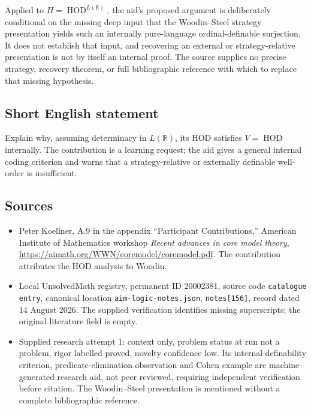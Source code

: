 \documentclass[11pt]{article}
\newcommand{\R}{\mathbb{R}}
\begin{document}
Applied to $H=\operatorname{HOD}^{L(\R)}$, the aid's proposed argument is deliberately conditional on the missing deep input that the Woodin--Steel strategy presentation yields such an internally pure-language ordinal-definable surjection. It does not establish that input, and recovering an external or strategy-relative presentation is not by itself an internal proof. The source supplies no precise strategy, recovery theorem, or full bibliographic reference with which to replace that missing hypothesis.
\subsection{Short English statement}
Explain why, assuming determinacy in $L(\R)$, its HOD satisfies $V=\operatorname{HOD}$ internally. The contribution is a learning request; the aid gives a general internal coding criterion and warns that a strategy-relative or externally definable well-order is insufficient.
\subsection{Sources}
\begin{itemize}
\item Peter Koellner, A.9 in the appendix ``Participant Contributions,'' American Institute of Mathematics workshop \emph{Recent advances in core model theory}, \url{https://aimath.org/WWN/coremodel/coremodel.pdf}. The contribution attributes the HOD analysis to Woodin.
\item Local UnsolvedMath registry, permanent ID 20002381, source code \texttt{catalogue entry}, canonical location \texttt{aim-logic-notes.json}, \texttt{notes[156]}, record dated 14 August 2026. The supplied verification identifies missing superscripts; the original literature field is empty.
\item Supplied research attempt 1: context only, problem status at run not a problem, rigor labelled proved, novelty confidence low. Its internal-definability criterion, predicate-elimination observation and Cohen example are machine-generated research aid, not peer reviewed, requiring independent verification before citation. The Woodin--Steel presentation is mentioned without a complete bibliographic reference.
\end{itemize}
\end{document}
